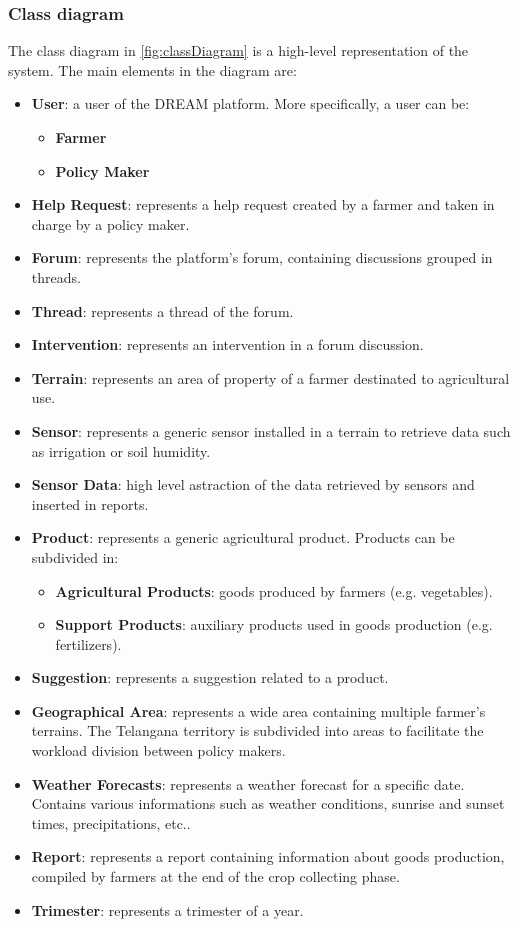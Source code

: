 \documentclass[10pt]{article}
\begin{document}
\subsubsection{Class diagram}
The class diagram in \ref{fig:classDiagram} is a high-level representation of the system. The main elements in the diagram are:
\begin{itemize}
    \item \textbf{User}: a user of the DREAM platform. More specifically, a user can be:
    \begin{itemize}
        \item \textbf{Farmer}
        \item \textbf{Policy Maker}
    \end{itemize} 
    \item \textbf{Help Request}: represents a help request created by a farmer and taken in charge by a policy maker.
    \item \textbf{Forum}: represents the platform's forum, containing discussions grouped in threads.
    \item \textbf{Thread}: represents a thread of the forum.
    \item \textbf{Intervention}: represents an intervention in a forum discussion.
    \item \textbf{Terrain}: represents an area of property of a farmer destinated to agricultural use.
    \item \textbf{Sensor}: represents a generic sensor installed in a terrain to retrieve data such as irrigation or soil humidity.
    \item \textbf{Sensor Data}: high level astraction of the data retrieved by sensors and inserted in reports.
    \item \textbf{Product}: represents a generic agricultural product. Products can be subdivided in:
    \begin{itemize}
        \item \textbf{Agricultural Products}: goods produced by farmers (e.g. vegetables).
        \item \textbf{Support Products}: auxiliary products used in goods production (e.g. fertilizers).
    \end{itemize} 
    \item \textbf{Suggestion}: represents a suggestion related to a product.
    \item \textbf{Geographical Area}: represents a wide area containing multiple farmer's terrains. The Telangana territory is subdivided into areas to facilitate the workload division between policy makers.
    \item \textbf{Weather Forecasts}: represents a weather forecast for a specific date. Contains various informations such as weather conditions, sunrise and sunset times, precipitations, etc..
    \item \textbf{Report}: represents a report containing information about goods production, compiled by farmers at the end of the crop collecting phase.
    \item \textbf{Trimester}: represents a trimester of a year.
\end{itemize}
\end{document}
